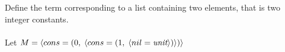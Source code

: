 \subsection{}

Define the term corresponding to a list containing two elements, that is two integer constants.\\~\\
Let $M = \langle cons = (0,\;\langle cons = (1,\;\langle nil = \emph{unit} \rangle) \rangle) \rangle$
